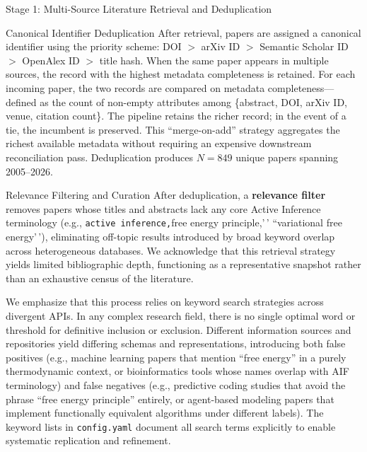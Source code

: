\documentclass[
  ignorenonframetext,
]{beamer}
\begin{document}
\begin{frame}[fragile]{Stage 1: Multi-Source Literature Retrieval and
Deduplication \label{sec:methods_retrieval}}
\begin{block}{Canonical Identifier Deduplication}
\protect{}\label{canonical-identifier-deduplication}
After retrieval, papers are assigned a canonical identifier using the
priority scheme: DOI \(>\) arXiv ID \(>\) Semantic Scholar ID \(>\)
OpenAlex ID \(>\) title hash. When the same paper appears in multiple
sources, the record with the highest metadata completeness is retained.
For each incoming paper, the two records are compared on metadata
completeness---defined as the count of non-empty attributes among
\{abstract, DOI, arXiv ID, venue, citation count\}. The pipeline retains
the richer record; in the event of a tie, the incumbent is preserved.
This ``merge-on-add'' strategy aggregates the richest available metadata
without requiring an expensive downstream reconciliation pass.
Deduplication produces \(N = 849\) unique papers spanning 2005--2026.
\end{block}

\begin{block}{Relevance Filtering and Curation}
\protect{}\label{relevance-filtering-and-curation}
After deduplication, a \textbf{relevance filter} removes papers whose
titles and abstracts lack any core Active Inference terminology (e.g.,
\texttt{active\ inference,\textquotesingle{}\textquotesingle{}}free
energy principle,'\,' ``variational free energy'\,'), eliminating
off-topic results introduced by broad keyword overlap across
heterogeneous databases. We acknowledge that this retrieval strategy
yields limited bibliographic depth, functioning as a representative
snapshot rather than an exhaustive census of the literature.

We emphasize that this process relies on keyword search strategies
across divergent APIs. In any complex research field, there is no single
optimal word or threshold for definitive inclusion or exclusion.
Different information sources and repositories yield differing schemas
and representations, introducing both false positives (e.g., machine
learning papers that mention ``free energy'' in a purely thermodynamic
context, or bioinformatics tools whose names overlap with AIF
terminology) and false negatives (e.g., predictive coding studies that
avoid the phrase ``free energy principle'' entirely, or agent-based
modeling papers that implement functionally equivalent algorithms under
different labels). The keyword lists in \texttt{config.yaml} document
all search terms explicitly to enable systematic replication and
refinement.


\end{block}
\end{frame}
\end{document}

